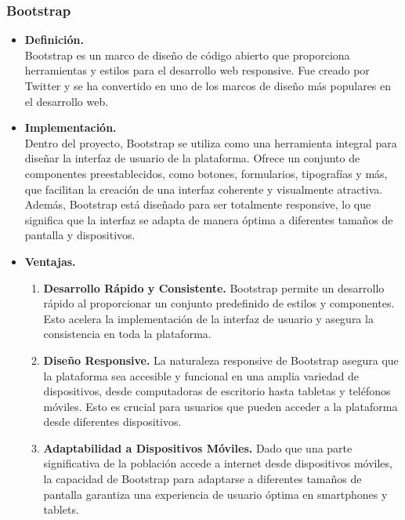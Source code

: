 \documentclass{article}
\begin{document}
        \subsubsection{Bootstrap}
            \begin{itemize}
                \item \textbf{Definición.}\\
                Bootstrap es un marco de diseño de código abierto que proporciona herramientas y estilos para el desarrollo web responsive. Fue creado por Twitter y se ha convertido en uno de los marcos de diseño más populares en el desarrollo web.

                \item \textbf{Implementación.}\\
                Dentro del proyecto, Bootstrap se utiliza como una herramienta integral para diseñar la interfaz de usuario de la plataforma. Ofrece un conjunto de componentes preestablecidos, como botones, formularios, tipografías y más, que facilitan la creación de una interfaz coherente y visualmente atractiva. Además, Bootstrap está diseñado para ser totalmente responsive, lo que significa que la interfaz se adapta de manera óptima a diferentes tamaños de pantalla y dispositivos.

                \item \textbf{Ventajas.}
                \begin{enumerate}
                    \item \textbf{Desarrollo Rápido y Consistente.} Bootstrap permite un desarrollo rápido al proporcionar un conjunto predefinido de estilos y componentes. Esto acelera la implementación de la interfaz de usuario y asegura la consistencia en toda la plataforma.

                    \item \textbf{Diseño Responsive.} La naturaleza responsive de Bootstrap asegura que la plataforma sea accesible y funcional en una amplia variedad de dispositivos, desde computadoras de escritorio hasta tabletas y teléfonos móviles. Esto es crucial para usuarios que pueden acceder a la plataforma desde diferentes dispositivos.

                    \item \textbf{Adaptabilidad a Dispositivos Móviles.} Dado que una parte significativa de la población accede a internet desde dispositivos móviles, la capacidad de Bootstrap para adaptarse a diferentes tamaños de pantalla garantiza una experiencia de usuario óptima en smartphones y tablets.


\end{enumerate}
\end{itemize}
\end{document}
